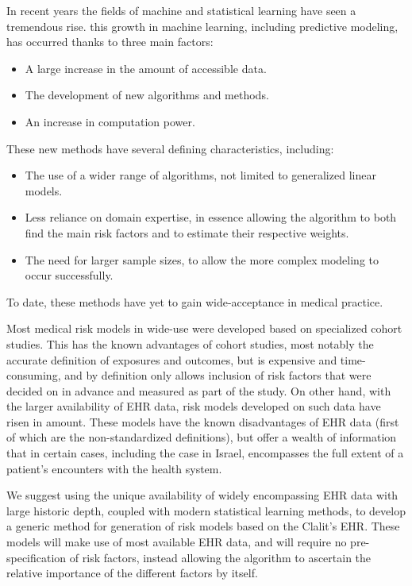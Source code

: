 \documentclass[a4paper,12pt]{article}
\begin{document}
	In recent years the fields of machine and statistical learning have seen a tremendous rise\cite{Obermeyer2016}. this growth in machine learning, including predictive modeling, has occurred thanks to three main factors\cite{Shalev-Shwartz2014}:
	\begin{itemize}
		\item A large increase in the amount of accessible data.
		\item The development of new algorithms and methods.
		\item An increase in computation power.
	\end{itemize} 
	These new methods have several defining characteristics, including:
	\begin{itemize}
		\item The use of a wider range of algorithms, not limited to generalized linear models.
		\item Less reliance on domain expertise, in essence allowing the algorithm to both find the main risk factors and to estimate their respective weights.
		\item The need for larger sample sizes, to allow the more complex modeling to occur successfully.
	\end{itemize}
	To date, these methods have yet to gain wide-acceptance in medical practice\cite{Obermeyer2016}.
	
	Most medical risk models in wide-use were developed based on specialized cohort studies\cite{Goldstein2016}. This has the known advantages of cohort studies, most notably the accurate definition of exposures and outcomes, but is expensive and time-consuming, and by definition only allows inclusion of risk factors that were decided on in advance and measured as part of the study. On other hand, with the larger availability of EHR data, risk models developed on such data have risen in amount. These models have the known disadvantages of EHR data (first of which are the non-standardized definitions), but offer a wealth of information that in certain cases, including the case in Israel\cite{Lovis2015}, encompasses the full extent of a patient's encounters with the health system\cite{Goldstein2017}.
	
	We suggest using the unique availability of widely encompassing EHR data with large historic depth, coupled with modern statistical learning methods, to develop a generic method for generation of risk models based on the Clalit's EHR. These models will make use of most available EHR data, and will require no pre-specification of risk factors, instead allowing the algorithm to ascertain the relative importance of the different factors by itself.
	
\end{document}
